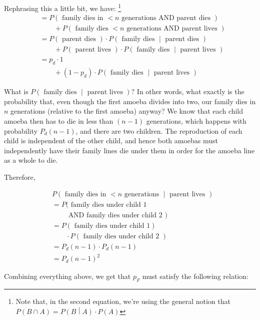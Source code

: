 Rephrasing this a little bit, we have: \footnote{Note that, in the second equation, we're using the general notion that $P(B \cap A) = P\left(B \middle| A\right) \cdot P(A)$}
\begin{align*}
&= P(\text{ family dies in $< n$ generations AND parent dies }) \\
&\qquad + P(\text{ family dies $< n$ generations AND parent lives }) \\
&= P(\text{ parent dies }) \cdot P\left(\text{ family dies } \middle| \text{ parent dies }\right) \\
&\qquad + P(\text{ parent lives }) \cdot P\left(\text{ family dies } \middle| \text{ parent lives }\right) \\
&= p_d \cdot 1 \\
&\qquad + (1 - p_d) \cdot P\left(\text{ family dies } \middle| \text{ parent lives }\right)
\end{align*}

What is $P\left(\text{ family dies } \middle| \text{ parent lives }\right)$? In other words, what exactly is the probability that, even though the first amoeba divides into two, our family dies in $n$ generations (relative to the first amoeba) anyway? We know that each child amoeba then has to die in less than $(n-1)$ generations, which happens with probability $P_d(n-1)$, and there are two children. The reproduction of each child is independent of the other child, and hence both amoebas must independently have their family lines die under them in order for the amoeba line as a whole to die.

Therefore, 

\begin{align*}
&P\left(\text{ family dies in $<n$ generations } \middle| \text{ parent lives }\right) \\
&= P(\text{ family dies under child 1} \\
&\qquad\text{ AND family dies under child 2 }) \\
&= P\left(\text{ family dies under child 1} \right) \\ 
&\qquad\cdot P\left(\text{ family dies under child 2 } \right) \\
&= P_d(n-1) \cdot P_d(n-1) \\
&= P_d(n-1)^2
\end{align*}


Combining everything above, we get that $p_F$ must satisfy the following relation:

